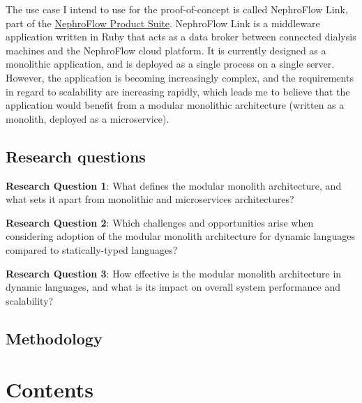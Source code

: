 \documentclass[12pt]{article}
\begin{document}
	The use case I intend to use for the proof-of-concept is called NephroFlow Link, part of the \href{https://www.nipro-group.com/en/our-offer/products-services/nephroflowtm-product-suite}{NephroFlow Product Suite}.
	NephroFlow Link is a middleware application written in Ruby that acts as a data broker between connected dialysis machines and the NephroFlow cloud platform.
	It is currently designed as a monolithic application, and is deployed as a single process on a single server.
	However, the application is becoming increasingly complex, and the requirements in regard to scalability are increasing rapidly, which leads me to believe that the application would benefit from a modular monolithic architecture (written as a monolith, deployed as a microservice).

	\subsection{Research questions}\label{subsec:research-questions}

	\textbf{Research Question 1}: What defines the modular monolith architecture, and what sets it apart from monolithic and microservices architectures?

	\textbf{Research Question 2}: Which challenges and opportunities arise when considering adoption of the modular monolith architecture for dynamic languages compared to statically-typed languages?

	\textbf{Research Question 3}: How effective is the modular monolith architecture in dynamic languages, and what is its impact on overall system performance and scalability?

	\subsection{Methodology}\label{subsec:methodology}

	\clearpage

	\section{Contents}\label{sec:contents}
\end{document}
